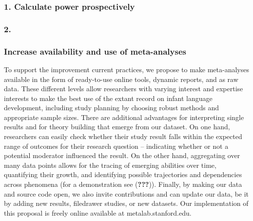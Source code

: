 \documentclass[english,floatsintext,man]{apa6}
\begin{document}
\subsubsection{1. Calculate power
prospectively}\label{calculate-power-prospectively}

\subsubsection{2.}\label{section}

\subsubsection{Increase availability and use of
meta-analyses}\label{increase-availability-and-use-of-meta-analyses}

To support the improvement current practices, we propose to make
meta-analyses available in the form of ready-to-use online tools,
dynamic reports, and as raw data. These different levels allow
researchers with varying interest and expertise interests to make the
best use of the extant record on infant language development, including
study planning by choosing robust methods and appropriate sample sizes.
There are additional advantages for interpreting single results and for
theory building that emerge from our dataset. On one hand, researchers
can easily check whether their study result falls within the expected
range of outcomes for their research question -- indicating whether or
not a potential moderator influenced the result. On the other hand,
aggregating over many data points allows for the tracing of emerging
abilities over time, quantifying their growth, and identifying possible
trajectories and dependencies across phenomena (for a demonstration see
({\textbf{???}})). Finally, by making our data and source code open, we
also invite contributions and can update our data, be it by adding new
results, filedrawer studies, or new datasets. Our implementation of this
proposal is freely online available at metalab.stanford.edu.
\end{document}
